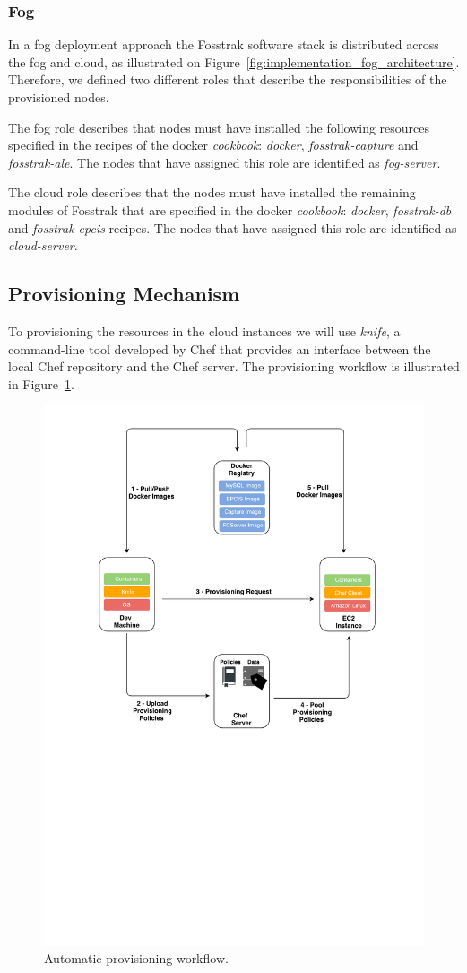 \subsubsection{Fog}
\label{subs:fog_provisioning}
In a fog deployment approach the Fosstrak software stack is distributed across the fog and cloud,
as illustrated on Figure~\ref{fig:implementation_fog_architecture}. Therefore, we defined two different
roles that describe the responsibilities of the provisioned nodes.

The fog role describes that nodes must have installed the following resources specified in the
recipes of the docker \textit{cookbook}: \textit{docker}, \textit{fosstrak-capture} and
\textit{fosstrak-ale}. The nodes that have assigned this role are identified as \textit{fog-server}.

The cloud role describes that the nodes must have installed the remaining modules of Fosstrak
that are specified in the docker \textit{cookbook}: \textit{docker}, \textit{fosstrak-db} and
\textit{fosstrak-epcis} recipes. The nodes that have assigned this role are identified as
\textit{cloud-server}.

\subsection{Provisioning Mechanism}
\label{sub:provisioning_mechanism}
To provisioning the resources in the cloud instances we will use \textit{knife}, a command-line tool
developed by Chef that provides an interface between the local Chef repository and the Chef server.
The provisioning workflow is illustrated in Figure~\ref{fig:provisioning_tech_architecture}.\\

\begin{figure}[ht!]
  \centering
  \includegraphics[width=.5\textwidth]{./figures/c4t-tech-architecture}
  \caption[Automatic provisioning workflow.]{Automatic provisioning workflow.}
  \label{fig:provisioning_tech_architecture}
\end{figure}

